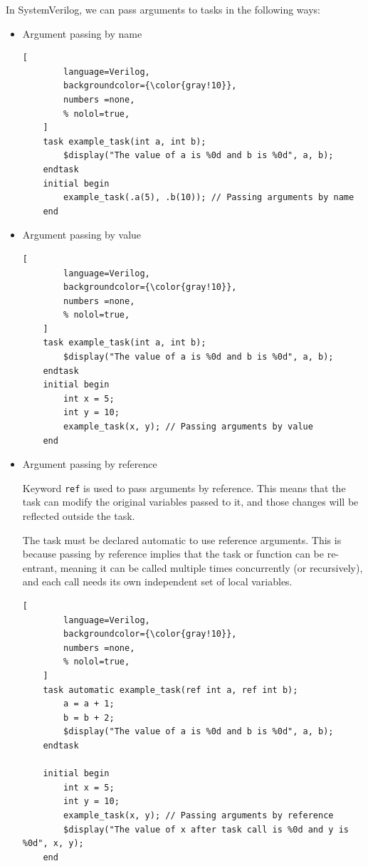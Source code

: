 \documentclass[12pt, a4paper]{article}
\begin{document}
In SystemVerilog, we can pass arguments to tasks in the following ways:
\begin{itemize}
    \item Argument passing by name
    
    \begin{lstlisting}[
        language=Verilog,
        backgroundcolor={\color{gray!10}},
        numbers =none,
        % nolol=true,
    ]
    task example_task(int a, int b);
        $display("The value of a is %0d and b is %0d", a, b);
    endtask
    initial begin
        example_task(.a(5), .b(10)); // Passing arguments by name
    end
    \end{lstlisting}

    \item Argument passing by value
    
    \begin{lstlisting}[
        language=Verilog,
        backgroundcolor={\color{gray!10}},
        numbers =none,
        % nolol=true,
    ]
    task example_task(int a, int b);
        $display("The value of a is %0d and b is %0d", a, b);
    endtask
    initial begin
        int x = 5;
        int y = 10;
        example_task(x, y); // Passing arguments by value
    end
    \end{lstlisting}
    
    \item Argument passing by reference
    
    Keyword \texttt{ref} is used to pass arguments by reference. This means that the task can modify the original variables passed to it, and those changes will be reflected outside the task. 
    
    The task must be declared automatic to use reference arguments. This is because passing by reference implies that the task or function can be re-entrant, meaning it can be called multiple times concurrently (or recursively), and each call needs its own independent set of local variables.

    \begin{lstlisting}[
        language=Verilog,
        backgroundcolor={\color{gray!10}},
        numbers =none,
        % nolol=true,
    ]
    task automatic example_task(ref int a, ref int b);
        a = a + 1;
        b = b + 2;
        $display("The value of a is %0d and b is %0d", a, b);
    endtask

    initial begin
        int x = 5;
        int y = 10;
        example_task(x, y); // Passing arguments by reference
        $display("The value of x after task call is %0d and y is %0d", x, y);
    end
    \end{lstlisting}

\end{itemize}
\end{document}
